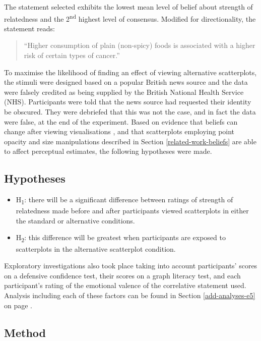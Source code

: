 \documentclass[../main.tex]{subfiles}
\begin{document}
The statement selected exhibits the lowest mean level of belief about
strength of relatedness and the 2\textsuperscript{nd} highest level of
consensus. Modified for directionality, the statement reads:

\begin{quotation}
``Higher consumption of plain (non-spicy) foods is associated with a higher risk of certain types of cancer.''
\end{quotation}

To maximise the likelihood of finding an effect of viewing alternative
scatterplots, the stimuli were designed based on a popular British news
source and the data were falsely credited as being supplied by the
British National Health Service (NHS). Participants were told that the
news source had requested their identity be obscured. They were
debriefed that this was not the case, and in fact the data were false,
at the end of the experiment. Based on evidence that beliefs can change
after viewing visualisations \cite{karduni_2021, markant_2023}, and that
scatterplots employing point opacity and size manipulations described in
Section \ref{related-work-beliefs} are able to affect perceptual
estimates, the following hypotheses were made.

\subsection{Hypotheses}\label{hypotheses-e5}

\begin{itemize}
\tightlist
\item
  H\textsubscript{1}: there will be a significant difference between
  ratings of strength of relatedness made before and after participants
  viewed scatterplots in either the standard or alternative conditions.
\item
  H\textsubscript{2}: this difference will be greatest when participants
  are exposed to scatterplots in the alternative scatterplot condition.
\end{itemize}

Exploratory investigations also took place taking into account
participants' scores on a defensive confidence test, their scores on a
graph literacy test, and each participant's rating of the emotional
valence of the correlative statement used. Analysis including each of
these factors can be found in Section \ref{add-analyses-e5} on page
\pageref{add-analyses-e5}.

\subsection{Method}\label{method-e5}
\end{document}
